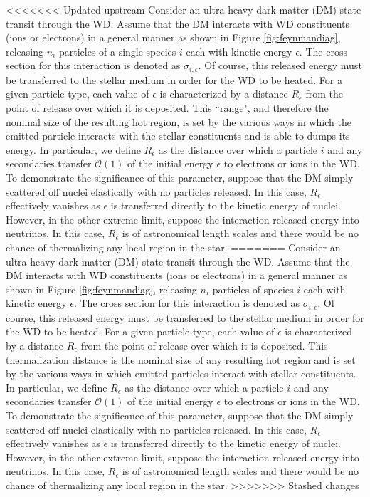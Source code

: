 \documentclass[11 pt,preprint,preprintnumbers,amsmath,amssymb, prd]{revtex4}
\newcommand{\OO}{\mathcal{O}}
\begin{document}
<<<<<<< Updated upstream
Consider an ultra-heavy dark matter (DM) state transit through the WD. Assume that the DM interacts with WD constituents (ions or electrons) in a general manner as shown in Figure \ref{fig:feynmandiag}, releasing $n_i$ particles of a single species $i$ each with kinetic energy $\epsilon$. The cross section for this interaction is denoted as $\sigma_{i,\epsilon}$. Of course, this released energy must be transferred to the stellar medium in order for the WD to be heated. For a given particle type, each value of $\epsilon$ is characterized by a distance $R_\epsilon$ from the point of release over which it is deposited. This ``range", and therefore the nominal size of the resulting hot region, is set by the various ways in which the emitted particle interacts with the stellar constituents and is able to dumps its energy. In particular, we define $R_\epsilon$ as the distance over which a particle $i$ and any secondaries transfer $\OO(1)$ of the initial energy $\epsilon$ to electrons or ions in the WD. To demonstrate the significance of this parameter, suppose that the DM simply scattered off nuclei elastically with no particles released. In this case, $R_\epsilon$ effectively vanishes as $\epsilon$ is transferred directly to the kinetic energy of nuclei. However, in the other extreme limit, suppose the interaction released energy into neutrinos. In this case, $R_\epsilon$ is of astronomical length scales and there would be no chance of thermalizing any local region in the star.
=======
Consider an ultra-heavy dark matter (DM) state transit through the WD. Assume that the DM interacts with WD constituents (ions or electrons) in a general manner as shown in Figure \ref{fig:feynmandiag}, releasing $n_i$ particles of species $i$ each with kinetic energy $\epsilon$. The cross section for this interaction is denoted as $\sigma_{i,\epsilon}$. Of course, this released energy must be transferred to the stellar medium in order for the WD to be heated. For a given particle type, each value of $\epsilon$ is characterized by a distance $R_\epsilon$ from the point of release over which it is deposited. This thermalization distance is the nominal size of any resulting hot region and is set by the various ways in which emitted particles interact with stellar constituents. In particular, we define $R_\epsilon$ as the distance over which a particle $i$ and any secondaries transfer $\OO(1)$ of the initial energy $\epsilon$ to electrons or ions in the WD. To demonstrate the significance of this parameter, suppose that the DM simply scattered off nuclei elastically with no particles released. In this case, $R_\epsilon$ effectively vanishes as $\epsilon$ is transferred directly to the kinetic energy of nuclei. However, in the other extreme limit, suppose the interaction released energy into neutrinos. In this case, $R_\epsilon$ is of astronomical length scales and there would be no chance of thermalizing any local region in the star. 
>>>>>>> Stashed changes
\end{document}
